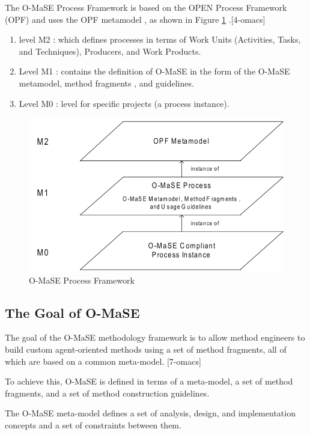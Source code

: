 The O-MaSE Process Framework is based on the OPEN Process Framework (OPF)
 and uses the OPF metamodel  , as shown in Figure \ref{fig:O-MaSE Process Framework}  .[4-omacs]

\begin{enumerate}
\item 
	level M2 : which defines processes in terms of Work Units (Activities, Tasks, and Techniques),
	 Producers, and Work Products.
\item
	Level M1 : contains the definition of O-MaSE in the form of the O-MaSE metamodel, method fragments
	, and guidelines. 
\item
	Level M0  : level for specific projects (a process instance).
\end{enumerate} 

\begin{figure}[th]
	\centering
		\includegraphics{chapiter1/img/omase}
	\caption{\label{fig:O-MaSE Process Framework}O-MaSE Process Framework}
\end{figure}
\subsection{ The Goal of O-MaSE }

The goal of the O-MaSE methodology framework is to allow method engineers to
build custom agent-oriented methods using a set of method fragments, all of which are
based on a common meta-model. [7-omacs]

To achieve this, O-MaSE is defined in terms of a meta-model, a set of method fragments, and a set of method construction guidelines. 

The O-MaSE meta-model defines a set of analysis, design, and implementation concepts and a
set of constraints between them. 

